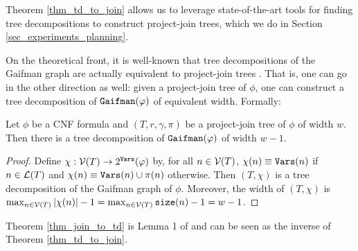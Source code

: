 Theorem \ref{thm_td_to_join} allows us to leverage state-of-the-art tools for finding tree decompositions \cite{Tamaki17,strasser2017computing,AMW17} to construct project-join trees, which we do in Section \ref{sec_experiments_planning}.

On the theoretical front, it is well-known that tree decompositions of the Gaifman graph are actually equivalent to project-join trees \cite{MPPV04}.
That is, one can go in the other direction as well: given a project-join tree of $\phi$, one can construct a tree decomposition of $\texttt{\upshape Gaifman}(\varphi)$ of equivalent width.
Formally:
\begin{theorem}
\label{thm_join_to_td}
    Let $\phi$ be a CNF formula and $(T, r, \gamma, \pi)$ be a project-join tree of $\phi$ of width $w$.
    Then there is a tree decomposition of $\texttt{\upshape Gaifman}(\varphi)$ of width $w-1$.
\end{theorem}
\begin{proof}
    Define $\chi: \mathcal{V}(T) \to 2^{\texttt{\upshape Vars}}(\varphi)$ by, for all $n \in \mathcal{V}(T)$,
    $\chi(n) \equiv\texttt{\upshape Vars}(n)$ if $n \in \mathcal{L}(T)$ and $\chi(n) \equiv \texttt{\upshape Vars}(n) \cup \pi(n)$ otherwise.
    Then $(T, \chi)$ is a tree decomposition of the Gaifman graph of $\phi$.
    Moreover, the width of $(T, \chi)$ is $\max_{n \in \mathcal{V}(T)} \left| \chi (n) \right|  - 1 = \max_{n \in \mathcal{V}(T)} \texttt{\upshape size}(n) - 1 = w - 1$.
\end{proof}
Theorem \ref{thm_join_to_td} is Lemma 1 of \cite{MPPV04} and can be seen as the inverse of Theorem \ref{thm_td_to_join}.

